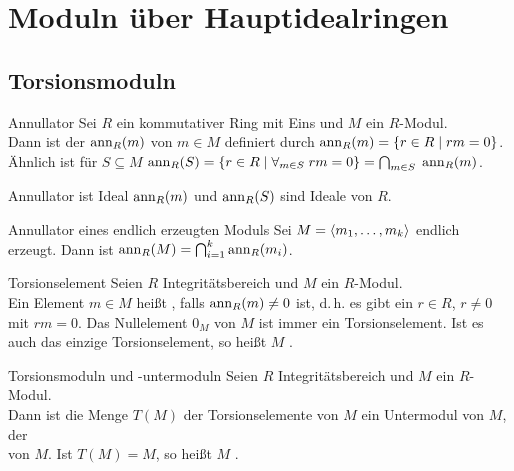 \chapter{%
    Moduln über Hauptidealringen%
}

\section{%
    Torsionsmoduln%
}

\begin{Def}{Annullator}
    Sei $R$ ein kommutativer Ring mit Eins und $M$ ein $R$-Modul. \\
    Dann ist der  $\operatorname{ann}_R(m)$ von $m \in M$ definiert durch
    $\operatorname{ann}_R(m) = \{r \in R \;|\; rm = 0\}$. \\
    Ähnlich ist für $S \subseteq M$ $\operatorname{ann}_R(S) =
    \{r \in R \;|\; \forall_{m \in S}\; rm = 0\} =
    \bigcap_{m \in S}\; \operatorname{ann}_R(m)$.
\end{Def}

\begin{Lemma}{Annullator ist Ideal}
    $\operatorname{ann}_R(m)$ und $\operatorname{ann}_R(S)$ sind Ideale von $R$.
\end{Lemma}

\begin{Lemma}{Annullator eines endlich erzeugten Moduls}
    Sei $M = \langle m_1, \dotsc, m_k \rangle$ endlich erzeugt.
    Dann ist $\operatorname{ann}_R(M) = \bigcap_{i=1}^k \operatorname{ann}_R(m_i)$.
\end{Lemma}

\begin{Def}{Torsionselement}
    Seien $R$ Integritätsbereich und $M$ ein $R$-Modul. \\
    Ein Element $m \in M$ heißt , falls
    $\operatorname{ann}_R(m) \not= 0$ ist, d.\,h. es gibt ein $r \in R$, $r \not= 0$
    mit $rm = 0$.
    Das Nullelement $0_M$ von $M$ ist immer ein Torsionselement.
    Ist es auch das einzige Torsionselement, so heißt $M$
    .
\end{Def}

\begin{Def}{Torsionsmoduln und -untermoduln}
    Seien $R$ Integritätsbereich und $M$ ein $R$-Modul. \\
    Dann ist die Menge $T(M)$ der Torsionselemente von $M$ ein Untermodul
    von $M$, der \\
     von $M$.
    Ist $T(M) = M$, so heißt $M$ .
\end{Def}

